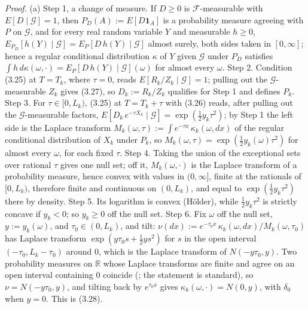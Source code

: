 \documentclass[11pt]{article}
\begin{document}
\emph{Proof.} (a) Step 1, a change of measure. If \(D \ge 0\) is \(\mathcal F\)-measurable with \(E[D \mid \mathcal G] = 1\), then \(P_D(A) := E[D \mathbf 1_A]\) is a probability measure agreeing with \(P\) on \(\mathcal G\), and for every real random variable \(Y\) and measurable \(h \ge 0\), \(E_{P_D}[h(Y) \mid \mathcal G] = E_P[D\, h(Y) \mid \mathcal G]\) almost surely, both sides taken in \([0, \infty]\); hence a regular conditional distribution \(\kappa\) of \(Y\) given \(\mathcal G\) under \(P_D\) satisfies \(\int h\,d\kappa(\omega, \cdot) = E_P[D\, h(Y) \mid \mathcal G](\omega)\) for almost every \(\omega\). Step 2. Condition (3.25) at \(T = T_k\), where \(\tau = 0\), reads \(E[R_k / Z_k \mid \mathcal G] = 1\); pulling out the \(\mathcal G\)-measurable \(Z_k\) gives (3.27), so \(D_k := R_k / Z_k\) qualifies for Step 1 and defines \(P_k\). Step 3. For \(\tau \in [0, L_k)\), (3.25) at \(T = T_k + \tau\) with (3.26) reads, after pulling out the \(\mathcal G\)-measurable factors, \(E[D_k\, e^{-\tau X_k} \mid \mathcal G] = \exp(\tfrac12 y_k \tau^2)\); by Step 1 the left side is the Laplace transform \(M_k(\omega, \tau) := \int e^{-\tau x}\,\kappa_k(\omega, dx)\) of the regular conditional distribution of \(X_k\) under \(P_k\), so \(M_k(\omega, \tau) = \exp(\tfrac12 y_k(\omega) \tau^2)\) for almost every \(\omega\), for each fixed \(\tau\). Step 4. Taking the union of the exceptional sets over rational \(\tau\) gives one null set; off it, \(M_k(\omega, \cdot)\) is the Laplace transform of a probability measure, hence convex with values in \((0, \infty]\), finite at the rationals of \([0, L_k)\), therefore finite and continuous on \((0, L_k)\), and equal to \(\exp(\tfrac12 y_k \tau^2)\) there by density. Step 5. Its logarithm is convex (Hölder), while \(\tfrac12 y_k \tau^2\) is strictly concave if \(y_k < 0\); so \(y_k \ge 0\) off the null set. Step 6. Fix \(\omega\) off the null set, \(y := y_k(\omega)\), and \(\tau_0 \in (0, L_k)\), and tilt: \(\nu(dx) := e^{-\tau_0 x}\,\kappa_k(\omega, dx) / M_k(\omega, \tau_0)\) has Laplace transform \(\exp(y \tau_0 s + \tfrac12 y s^2)\) for \(s\) in the open interval \((-\tau_0, L_k - \tau_0)\) around \(0\), which is the Laplace transform of \(N(-y\tau_0, y)\). Two probability measures on \(\mathbb R\) whose Laplace transforms are finite and agree on an open interval containing \(0\) coincide (\cite{curtiss1942note}; the statement is standard), so \(\nu = N(-y\tau_0, y)\), and tilting back by \(e^{\tau_0 x}\) gives \(\kappa_k(\omega, \cdot) = N(0, y)\), with \(\delta_0\) when \(y = 0\). This is (3.28).
\end{document}
